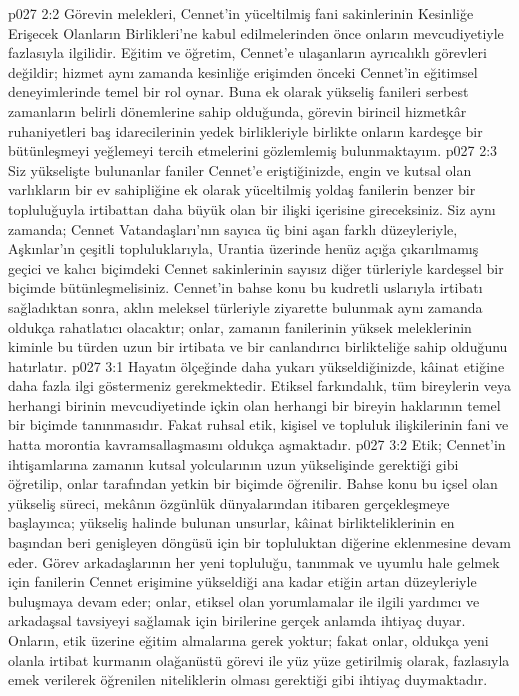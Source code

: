 \vs p027 2:2 Görevin melekleri, Cennet’in yüceltilmiş fani sakinlerinin Kesinliğe Erişecek Olanların Birlikleri’ne kabul edilmelerinden önce onların mevcudiyetiyle fazlasıyla ilgilidir. Eğitim ve öğretim, Cennet’e ulaşanların ayrıcalıklı görevleri değildir; hizmet aynı zamanda kesinliğe erişimden önceki Cennet’in eğitimsel deneyimlerinde temel bir rol oynar. Buna ek olarak yükseliş fanileri serbest zamanların belirli dönemlerine sahip olduğunda, görevin birincil hizmetkâr ruhaniyetleri baş idarecilerinin yedek birlikleriyle birlikte onların kardeşçe bir bütünleşmeyi yeğlemeyi tercih etmelerini gözlemlemiş bulunmaktayım.
\vs p027 2:3 Siz yükselişte bulunanlar faniler Cennet’e eriştiğinizde, engin ve kutsal olan varlıkların bir ev sahipliğine ek olarak yüceltilmiş yoldaş fanilerin benzer bir topluluğuyla irtibattan daha büyük olan bir ilişki içerisine gireceksiniz. Siz aynı zamanda; Cennet Vatandaşları’nın sayıca üç bini aşan farklı düzeyleriyle, Aşkınlar’ın çeşitli topluluklarıyla, Urantia üzerinde henüz açığa çıkarılmamış geçici ve kalıcı biçimdeki Cennet sakinlerinin sayısız diğer türleriyle kardeşsel bir biçimde bütünleşmelisiniz. Cennet’in bahse konu bu kudretli uslarıyla irtibatı sağladıktan sonra, aklın meleksel türleriyle ziyarette bulunmak aynı zamanda oldukça rahatlatıcı olacaktır; onlar, zamanın fanilerinin yüksek meleklerinin kiminle bu türden uzun bir irtibata ve bir canlandırıcı birlikteliğe sahip olduğunu hatırlatır.
\vs p027 3:1 Hayatın ölçeğinde daha yukarı yükseldiğinizde, kâinat etiğine daha fazla ilgi göstermeniz gerekmektedir. Etiksel farkındalık, tüm bireylerin veya herhangi birinin mevcudiyetinde içkin olan herhangi bir bireyin haklarının temel bir biçimde tanınmasıdır. Fakat ruhsal etik, kişisel ve topluluk ilişkilerinin fani ve hatta morontia kavramsallaşmasını oldukça aşmaktadır.
\vs p027 3:2 Etik; Cennet’in ihtişamlarına zamanın kutsal yolcularının uzun yükselişinde gerektiği gibi öğretilip, onlar tarafından yetkin bir biçimde öğrenilir. Bahse konu bu içsel olan yükseliş süreci, mekânın özgünlük dünyalarından itibaren gerçekleşmeye başlayınca; yükseliş halinde bulunan unsurlar, kâinat birlikteliklerinin en başından beri genişleyen döngüsü için bir topluluktan diğerine eklenmesine devam eder. Görev arkadaşlarının her yeni topluluğu, tanınmak ve uyumlu hale gelmek için fanilerin Cennet erişimine yükseldiği ana kadar etiğin artan düzeyleriyle buluşmaya devam eder; onlar, etiksel olan yorumlamalar ile ilgili yardımcı ve arkadaşsal tavsiyeyi sağlamak için birilerine gerçek anlamda ihtiyaç duyar. Onların, etik üzerine eğitim almalarına gerek yoktur; fakat onlar, oldukça yeni olanla irtibat kurmanın olağanüstü görevi ile yüz yüze getirilmiş olarak, fazlasıyla emek verilerek öğrenilen niteliklerin olması gerektiği gibi  ihtiyaç duymaktadır.
